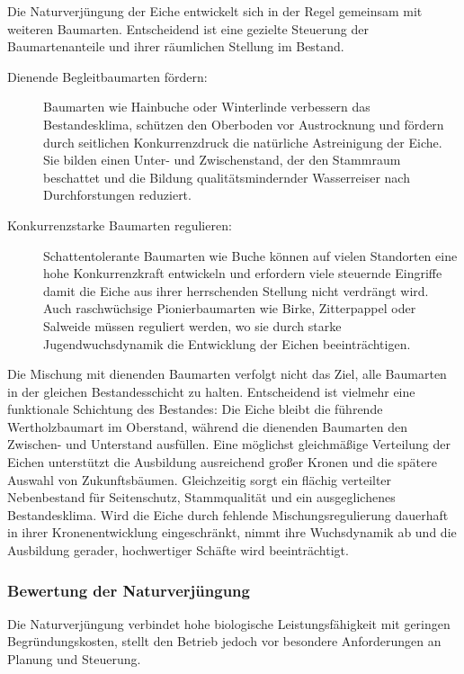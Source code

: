 \documentclass[twocolumn, bibliography=totoc, abstract=true]{scrartcl}
\begin{document}
Die Naturverjüngung der Eiche entwickelt sich in der Regel gemeinsam mit weiteren Baumarten. Entscheidend ist eine gezielte Steuerung der Baumartenanteile und ihrer räumlichen Stellung im Bestand.

\begin{description}
\item[Dienende Begleitbaumarten fördern:] Baumarten wie Hainbuche oder Winterlinde verbessern das Bestandesklima, schützen den Oberboden vor Austrocknung und fördern durch seitlichen Konkurrenzdruck die natürliche Astreinigung der Eiche. Sie bilden einen Unter- und Zwischenstand, der den Stammraum beschattet und die Bildung qualitätsmindernder Wasserreiser nach Durchforstungen reduziert.
\item[Konkurrenzstarke Baumarten regulieren:] Schattentolerante Baumarten wie Buche können auf vielen Standorten eine hohe Konkurrenzkraft entwickeln und erfordern viele steuernde Eingriffe damit die Eiche aus ihrer herrschenden Stellung nicht verdrängt wird. Auch raschwüchsige Pionierbaumarten wie Birke, Zitterpappel oder Salweide müssen reguliert werden, wo sie durch starke Jugendwuchsdynamik die Entwicklung der Eichen beeinträchtigen.
\end{description}

Die Mischung mit dienenden Baumarten verfolgt nicht das Ziel, alle Baumarten in der gleichen Bestandesschicht zu halten. Entscheidend ist vielmehr eine funktionale Schichtung des Bestandes: Die Eiche bleibt die führende Wertholzbaumart im Oberstand, während die dienenden Baumarten den Zwischen- und Unterstand ausfüllen. Eine möglichst gleichmäßige Verteilung der Eichen unterstützt die Ausbildung ausreichend großer Kronen und die spätere Auswahl von Zukunftsbäumen. Gleichzeitig sorgt ein flächig verteilter Nebenbestand für Seitenschutz, Stammqualität und ein ausgeglichenes Bestandesklima. Wird die Eiche durch fehlende Mischungsregulierung dauerhaft in ihrer Kronenentwicklung eingeschränkt, nimmt ihre Wuchsdynamik ab und die Ausbildung gerader, hochwertiger Schäfte wird beeinträchtigt.

\subsubsection{Bewertung der Naturverjüngung}

Die Naturverjüngung verbindet hohe biologische Leistungsfähigkeit mit geringen Begründungskosten, stellt den Betrieb jedoch vor besondere Anforderungen an Planung und Steuerung.
\end{document}
